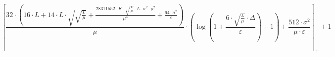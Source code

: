 \[\left\lceil \frac{32 \cdot \left(16 \cdot L + 14 \cdot L \cdot \sqrt{\sqrt{\frac{L}{\mu}}} + \frac{28311552 \cdot K \cdot \sqrt{\frac{L}{\mu}} \cdot L \cdot \sigma^{2} \cdot \rho^{2}}{\mu^{4}} + \frac{64 \cdot \sigma^{2}}{\varepsilon}\right)}{\mu} \cdot \left(\log\left(1 + \frac{6 \cdot \sqrt{\frac{L}{\mu}} \cdot \Delta}{\varepsilon}\right) + 1\right) + \frac{512 \cdot \sigma^{2}}{\mu \cdot \varepsilon} \right\rceil_{+} + 1\]
